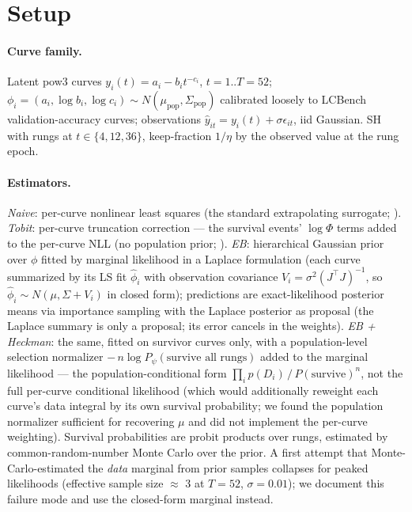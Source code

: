 \documentclass[10pt]{article}
\begin{document}
\section{Setup}
\label{sec:setup}

\paragraph{Curve family.} Latent pow3 curves $y_i(t) = a_i - b_i
t^{-c_i}$, $t = 1..T{=}52$; $\phi_i = (a_i, \log b_i, \log c_i) \sim
N(\mu_{\text{pop}}, \Sigma_{\text{pop}})$ calibrated loosely to LCBench
validation-accuracy curves; observations $\hat y_{it} = y_i(t) + \sigma
\epsilon_{it}$, iid Gaussian. SH with rungs at $t \in \{4, 12, 36\}$,
keep-fraction $1/\eta$ by the observed value at the rung epoch.

\paragraph{Estimators.} \emph{Naive}: per-curve nonlinear least squares
(the standard extrapolating surrogate; \citealp{domhan2015,kadra2023dpl}).
\emph{Tobit}: per-curve truncation correction --- the survival events'
$\log\Phi$ terms added to the per-curve NLL (no population prior;
\citealp{tobin1958}). \emph{EB}: hierarchical Gaussian prior over $\phi$
fitted by marginal likelihood in a Laplace formulation (each curve
summarized by its LS fit $\hat\phi_i$ with observation covariance $V_i =
\sigma^2 (J^\top J)^{-1}$, so $\hat\phi_i \sim N(\mu, \Sigma + V_i)$ in
closed form); predictions are exact-likelihood posterior means via
importance sampling with the Laplace posterior as proposal (the Laplace
summary is only a proposal; its error cancels in the weights).
\emph{EB + Heckman}: the same, fitted on survivor curves only, with a
population-level selection normalizer $-\,n\log P_{\psi}(\text{survive all
rungs})$ added to the marginal likelihood --- the population-conditional
form $\prod_i p(D_i)\,/\,P(\text{survive})^{n}$, not the full per-curve
conditional likelihood (which would additionally reweight each curve's
data integral by its own survival probability; we found the population
normalizer sufficient for recovering $\mu$ and did not implement the
per-curve weighting). Survival probabilities are probit products over
rungs, estimated by common-random-number Monte Carlo over the prior. A first attempt that Monte-Carlo-estimated the
\emph{data} marginal from prior samples collapses for peaked likelihoods
(effective sample size $\approx$ 3 at $T = 52$, $\sigma = 0.01$); we
document this failure mode and use the closed-form marginal instead.
\end{document}
